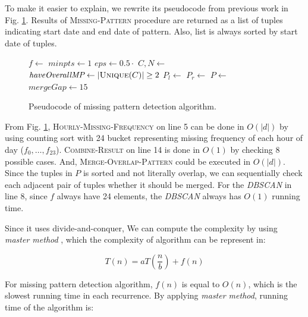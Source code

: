\documentclass[conference]{IEEEtran}
\begin{document}
To make it easier to explain, we rewrite its pseudocode from previous work in Fig. \ref{fig:missingpattern_pseudocode}. Results of \textsc{Missing-Pattern} procedure are returned as a list of tuples indicating start date and end date of pattern. Also, list is always sorted by start date of tuples.

\begin{figure}
\begin{algorithmic}[1]
\State\Return{$\emptyset$}
\EndIf
\State $f \gets$ 
\State $minpts \gets 1$
\State $eps \gets 0.5 \cdot $
\State $C, N \gets$ 
\State $\textit{haveOverallMP} \gets |\Call{Unique}{C}| \ge 2$ 
\State
\State $P_{l} \gets $
\State $P_{r} \gets$ 
\State $P \gets$ 
\State
\State $\textit{mergeGap} \gets 15$ 
\State {}
\EndProcedure
\end{algorithmic}
\caption{Pseudocode of missing pattern detection algorithm.}
\label{fig:missingpattern_pseudocode}
\end{figure}

From Fig. \ref{fig:missingpattern_pseudocode}, \textsc{Hourly-Missing-Frequency} on line 5 can be done in $O(|d|)$ by using counting sort with 24 bucket representing missing frequency of each hour of day ($f_{0},\ldots,f_{23}$). \textsc{Combine-Result} on line 14 is done in $O(1)$ by checking 8 possible cases. And, \textsc{Merge-Overlap-Pattern} could be executed in $O(|d|)$. Since the tuples in $P$ is sorted and not literally overlap, we can sequentially check each adjacent pair of tuples whether it should be merged. For the \textit{DBSCAN} in line 8, since $f$ always have 24 elements, the \textit{DBSCAN} always has $O(1)$ running time.

Since it uses divide-and-conquer, We can compute the complexity by using \textit{master method} \cite{clrs}, which the complexity of algorithm can be represent in:

\[
T(n) = aT(\frac{n}{b}) + f(n)
\]

For missing pattern detection algorithm, $f(n)$ is equal to $O(n)$, which is the slowest running time in each recurrence. By applying \textit{master method}, running time of the algorithm is:
\end{document}
